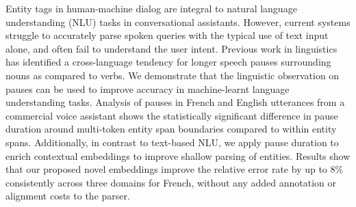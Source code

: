 Entity tags in human-machine dialog are integral to natural language understanding (NLU) tasks in conversational assistants. However, current systems struggle to accurately parse spoken queries with the typical use of text input alone, and often fail to understand the user intent. Previous work in linguistics has identified a cross-language tendency for longer speech pauses surrounding nouns as compared to verbs. We demonstrate that the linguistic observation on pauses can be used to improve accuracy in machine-learnt language understanding tasks. Analysis of pauses in French and English utterances from a commercial voice assistant shows the statistically significant difference in pause duration around multi-token entity span boundaries compared to within entity spans. Additionally, in contrast to text-based NLU, we apply pause duration to enrich contextual embeddings to improve shallow parsing of entities. Results show that our proposed novel embeddings improve the relative error rate by up to 8\% consistently across three domains for French, without any added annotation or alignment costs to the parser.
